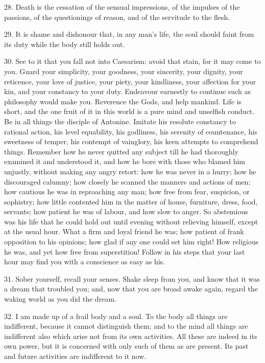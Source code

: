 \documentclass{book}
\begin{document}
28. Death is the cessation of the sensual impressions, of the impulses
of the passions, of the questionings of reason, and of the servitude
to the flesh.

29. It is shame and dishonour that, in any man's life, the soul should
faint from its duty while the body still holds out.

30. See to it that you fall not into Caesarism: avoid that stain, for
it may come to you. Guard your simplicity, your goodness, your
sincerity, your dignity, your reticence, your love of justice, your
piety, your kindliness, your affection for your kin, and your
constancy to your duty. Endeavour earnestly to continue such as
philosophy would make you. Reverence the Gods, and help mankind. Life
is short, and the one fruit of it in this world is a pure mind and
unselfish conduct. Be in all things the disciple of Antonine. Imitate
his resolute constancy to rational action, his level equability, his
godliness, his serenity of countenance, his sweetness of temper, his
contempt of vainglory, his keen attempts to comprehend things. Remember
how he never quitted any subject till he had thoroughly examined it
and understood it, and how he bore with those who blamed him unjustly,
without making any angry retort: how he was never in a hurry; how he
discouraged calumny; how closely he scanned the manners and actions of
men; how cautious he was in reproaching any man; how free from fear,
suspicion, or sophistry; how little contented him in the matter of
house, furniture, dress, food, servants; how patient he was of labour,
and how slow to anger. So abstemious was his life that he could hold
out until evening without relieving himself, except at the usual
hour. What a firm and loyal friend he was; how patient of frank
opposition to his opinions; how glad if any one could set him right!
How religious he was, and yet how free from superstition! Follow in
his steps that your last hour may find you with a conscience as easy
as his.

31. Sober yourself, recall your senses. Shake sleep from you, and know
that it was a dream that troubled you; and, now that you are broad
awake again, regard the waking world as you did the dream.

32. I am made up of a frail body and a soul. To the body all things
are indifferent, because it cannot distinguish them; and to the mind
all things are indifferent also which arise not from its own
activities. All these are indeed in its own power, but it is concerned
with only such of them as are present. Its past and future activities
are indifferent to it now.
\end{document}
